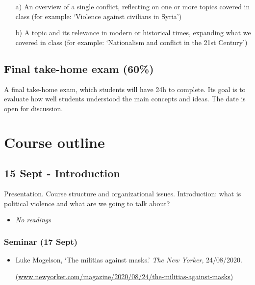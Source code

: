 \documentclass[12pt, a4paper]{article}
\begin{document}
\begin{itemize}
\setlength\itemsep{0pt}
\item[a)] An overview of a single conflict, reflecting on one or more topics covered in class (for example: `Violence against civilians in Syria')
\item[b)] A topic and its relevance in modern or historical times, expanding what we covered in class (for example: `Nationalism and conflict in the 21st Century')
\end{itemize}

\subsection*{Final take-home exam (60\%)}

A final take-home exam, which students will have 24h to complete. Its goal is to evaluate how well students understood the main concepts and ideas. The date is open for discussion.

\section{Course outline}

\subsection*{15 Sept - Introduction}

Presentation. Course structure and organizational issues. Introduction: what is political violence and what are we going to talk about?

\begin{itemize}
\setlength\itemsep{-5pt}
\item \textit{No readings}
\end{itemize}

\subsubsection*{Seminar (17 Sept)}

\begin{itemize}
\setlength\itemsep{-5pt}
\item Luke Mogelson, `The militias against masks.' \textit{The New Yorker}, 24/08/2020.
\item[] \href{https://www.newyorker.com/magazine/2020/08/24/the-militias-against-masks}{(www.newyorker.com/magazine/2020/08/24/the-militias-against-masks)}
\end{itemize}
\end{document}
